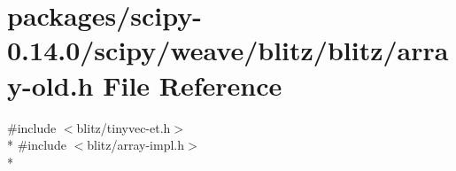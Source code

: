 \hypertarget{array-old_8h}{}\section{packages/scipy-\/0.14.0/scipy/weave/blitz/blitz/array-\/old.h File Reference}
\label{array-old_8h}
{\ttfamily \#include $<$blitz/tinyvec-\/et.\+h$>$}\\*
{\ttfamily \#include $<$blitz/array-\/impl.\+h$>$}\\*
